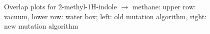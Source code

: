 \begin{figure}[h]
	\hfil
	
	\caption{Overlap plots for 2-methyl-1H-indole $\mathrm{\rightarrow}$ methane: upper row: vacuum, lower row: water box; left: old mutation algorithm, right: new mutation algorithm}
	\label{fig:methylindole_overlaps}
\end{figure}


